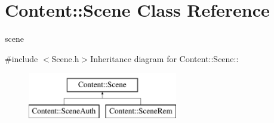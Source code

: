\hypertarget{classContent_1_1Scene}{
\section{Content::Scene Class Reference}
\label{classContent_1_1Scene}
}


scene  


{\ttfamily \#include $<$Scene.h$>$}Inheritance diagram for Content::Scene::\begin{figure}[H]
\begin{center}
\leavevmode
\includegraphics[height=2cm]{classContent_1_1Scene}
\end{center}
\end{figure}
